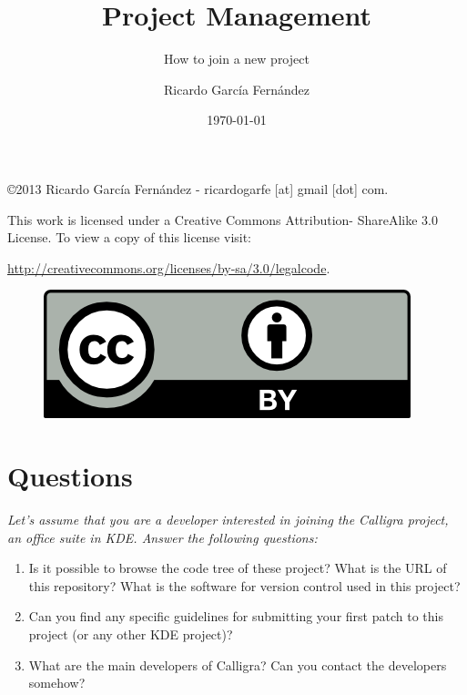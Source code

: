 \documentclass[11pt]{scrartcl}
\title{\textbf{Project Management}}
\subtitle{How to join a new project}
\author{Ricardo Garc\'ia Fern\'andez}
\date{\today}
\begin{document}
\maketitle

\vfill

\begin{flushright}
    \copyright  2013 Ricardo Garc\'ia Fern\'andez - ricardogarfe [at] gmail [dot] com.

    This work is licensed under a Creative Commons Attribution- ShareAlike 3.0 License.
    To view a copy of this license visit:
 
    \url{http://creativecommons.org/licenses/by-sa/3.0/legalcode}.
\end{flushright}

\begin{figure}[h]
    \begin{flushright}	
        \includegraphics{by}
        \label{fig:by-sa}
    \end{flushright}
\end{figure}

\newpage

\section{Questions}

\emph{Let's assume that you are a developer interested in joining the Calligra project, an office suite in KDE. Answer the following questions:}

\begin{enumerate}
	\item Is it possible to browse the code tree of these project? What is the URL of this repository? What is the software for version control used in this project?
	\item Can you find any specific guidelines for submitting your first patch to this project (or any other KDE project)?
	\item What are the main developers of Calligra? Can you contact the developers somehow?
\end{enumerate}
\end{document}
